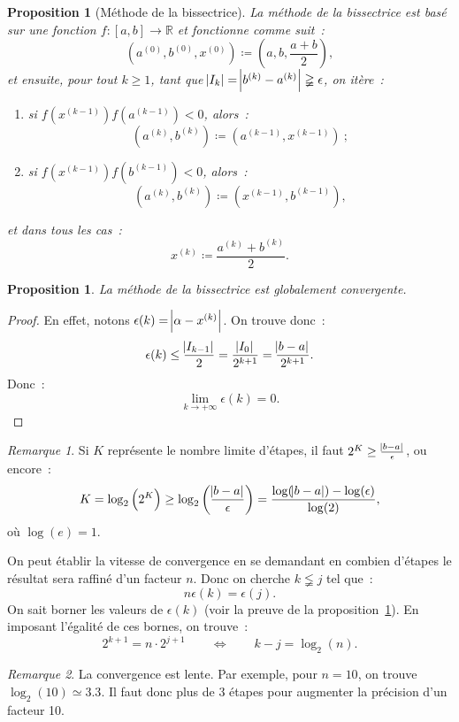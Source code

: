 \documentclass{article}
\newtheorem{prp}[thm]{Proposition}
\theoremstyle{definition}
\theoremstyle{remark}
\newtheorem*{rmq}{Remarque}
\newcommand{\R}{\mathbb R}
\begin{document}
		\begin{prp}[Méthode de la bissectrice] La méthode de la bissectrice est basé sur une fonction $f : [a, b] \to \R$ et fonctionne comme suit~:
		\[\left(a^{(0)}, b^{(0)}, x^{(0)}\right) \coloneqq \left(a, b, \frac {a+b}2\right),\]
		et ensuite, pour tout $k \geq 1$, tant que $\abs {I_k} = \abs{b^{(k)} - a^{(k)}} \gneqq \epsilon$, on itère~:
		\begin{enumerate}
			\item si $f(x^{(k-1)})f(a^{(k-1)}) < 0$, alors~:
				\[\left(a^{(k)}, b^{(k)}\right) \coloneqq \left(a^{(k-1)}, x^{(k-1)}\right)~;\]
			\item si $f(x^{(k-1)})f(b^{(k-1)}) < 0$, alors~:
				\[\left(a^{(k)}, b^{(k)}\right) \coloneqq \left(x^{(k-1)}, b^{(k-1)}\right),\]
		\end{enumerate}
		et dans tous les cas~:
		\[x^{(k)} \coloneqq \frac {a^{(k)} + b^{(k)}}2.\]
		\end{prp}

		\begin{prp}\label{prp:bissectriceconvglob} La méthode de la bissectrice est globalement convergente.
		\end{prp}

		\begin{proof} En effet, notons $\epsilon(k) = \abs {\alpha - x^{(k)}}$. On trouve donc~:
		\[\epsilon(k) \leq \frac {\abs {I_{k-1}}}2 = \frac {\abs {I_0}}{2^{k+1}} = \frac {\abs {b-a}}{2^{k+1}}.\]
		Donc~:
		\[\lim_{k \to +\infty}\epsilon(k) = 0.\]
		\end{proof}

		\begin{rmq} Si $K$ représente le nombre limite d'étapes, il faut $2^K \geq \frac {\abs {b-a}}\epsilon$, ou encore~:
		\[K = \log_2\left(2^K\right) \geq \log_2\left(\frac {\abs {b-a}}\epsilon\right) = \frac {\log(\abs{b-a}) - \log(\epsilon)}{\log(2)},\]
		où $\log(e) = 1$.
		\end{rmq}

		On peut établir la vitesse de convergence en se demandant en combien d'étapes le résultat sera raffiné d'un facteur $n$. Donc on cherche $k \lneqq j$
		tel que~:
		\[n\epsilon(k) = \epsilon(j).\]
		On sait borner les valeurs de $\epsilon(k)$ (voir la preuve de la proposition~\ref{prp:bissectriceconvglob}). En imposant l'égalité de ces bornes,
		on trouve~:
		\[2^{k+1} = n \cdot 2^{j+1}\qquad\iff\qquad k-j = \log_2(n).\]

		\begin{rmq} La convergence est lente. Par exemple, pour $n = 10$, on trouve $\log_2(10) \simeq 3.3$. Il faut donc plus de 3 étapes pour augmenter la
		précision d'un facteur 10.
		\end{rmq}
\end{document}
